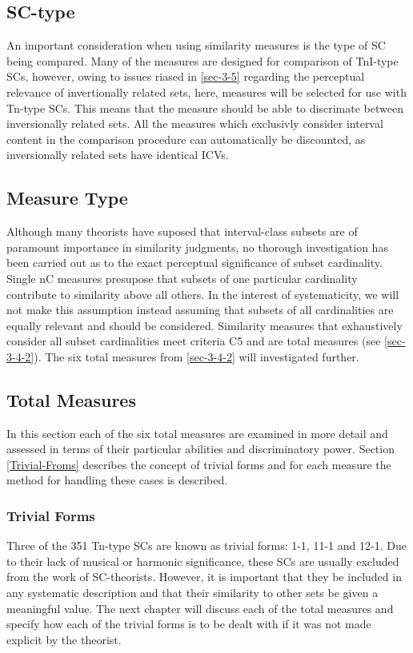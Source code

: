 \documentclass{article}
\begin{document}
\subsection{SC-type}
\label{sec-6-3}

An important consideration when using similarity measures is the type
of SC being compared. Many of the measures are designed for comparison
of TnI-type SCs, however, owing to issues riased in \ref{sec-3-5} regarding the perceptual relevance of invertionally related
sets, here, measures will be selected for use with Tn-type SCs. This
means that the measure should be able to discrimate between
inversionally related sets. All the measures which exclusivly consider
interval content in the comparison procedure can automatically be
discounted, as inversionally related sets have identical ICVs.
\subsection{Measure Type}
\label{sec-6-4}

Although many theorists have suposed that interval-class subsets are
of paramount importance in similarity judgments, no thorough
investigation has been carried out as to the exact perceptual
significance of subset cardinality. Single nC measures presupose that
subsets of one particular cardinality contribute to similarity above
all others. In the interest of systematicity, we will not make this
assumption instead assuming that subsets of all cardinalities are
equally relevant and should be considered. Similarity measures that
exhaustively consider all subset cardinalities meet criteria C5 and
are total measures (see \ref{sec-3-4-2}). The six total measures
from \ref{sec-3-4-2} will investigated further.
\subsection{Total Measures}
\label{sec-6-5}

In this section each of the six total measures are examined in more
detail and assessed in terms of their particular abilities and
discriminatory power. Section \ref{Trivial-Froms} describes the concept of
trivial forms and for each measure the method for handling these cases
is described.
\subsubsection{Trivial Forms}
\label{sec-6-5-1}

Three of the 351 Tn-type SCs are known as trivial forms: 1-1, 11-1 and
12-1. Due to their lack of musical or harmonic significance, these SCs
are usually excluded from the work of SC-theorists. However, it is
important that they be included in any systematic description and that
their similarity to other sets be given a meaningful value. The next
chapter will discuss each of the total measures and specify how each
of the trivial forms is to be dealt with if it was not made explicit
by the theorist. 
\end{document}
